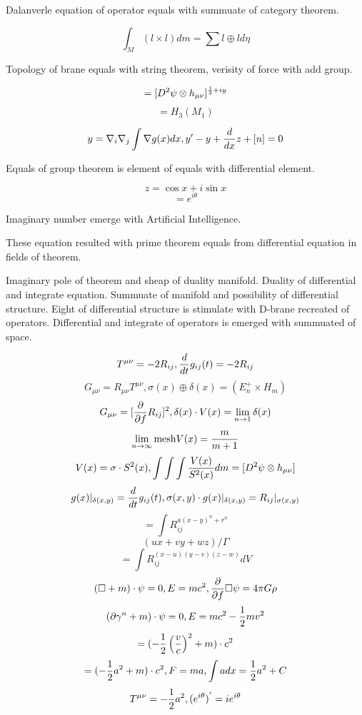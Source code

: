 \documentclass{jsarticle}
\begin{document}
  Dalanverle equation of operator equals with summuate of category theorem.

  $$ \int_M (l \times l) dm = \sum l \oplus l d \eta $$

  Topology of brane equals with string theorem, verisity of force with add group.

  $$ = [D^2 \psi \otimes h_{\mu\nu}]^{{1 \over 2} + iy} $$
  $$ = H_3(M_1) $$

  $$ y = \nabla_{i}\nabla_{j} \int \nabla g(x)dx, y' - y + {d \over dx}z + [n] = 0 $$

  Equals of group theorem is element of equals with differential element.

  $$ z = \cos x + i \sin x $$
  $$ = e^{i \theta} $$

  Imaginary number emerge with Artificial Intelligence.

  These equation resulted with prime theorem equals from differential equation in fields of theorem.

  Imaginary pole of theorem and sheap of duality manifold. Duality of differential and integrate equation.
  Summuate of manifold and possibility of differential structure.
  Eight of differential structure is stimulate with D-brane recreated of operators.
  Differential and integrate of operators is emerged with summuated of space.

  $$ T^{\mu\nu} = - 2 R_{ij}, {d \over dt}g_{ij}(t) = - 2 R_{ij} $$
  $$ G_{\mu\nu} = R_{\mu\nu}T^{\mu\nu}, \sigma(x) \oplus \delta(x) = (E^{+}_{n} \times H_m) $$
  $$ G_{\mu\nu} = [{\partial \over \partial f}R_{ij}]^{2}, \delta(x)\cdot V(x) = \lim_{n \to 1}\delta(x) $$
  $$ \lim_{n \to \infty} \mathrm{mesh} V(x) = {m \over m + 1} $$
  $$ V(x) = \sigma \cdot S^2(x), \int \int \int{V(x) \over S^2(x)}dm = [D^2 \psi \otimes h_{\mu\nu}] $$
  $$ g(x)|_{\delta(x,y)} = {d \over dt}g_{ij}(t), \sigma(x,y)\cdot g(x)|_{\delta(x,y)} = R_{ij}|_{\sigma(x,y)} $$
  $$ = \int R^{a(x - y)^n + r^n}_{ij} $$
  $$ (ux + vy + wz) / \Gamma $$
  $$ = \int R_{ij}^{(x - u)(y - v)(z - w)} dV $$
  $$ (\square + m)\cdot \psi = 0, E = mc^2, {\partial \over \partial f}\square \psi = 4 \pi G \rho $$
  $$ (\partial \gamma^n + m)\cdot \psi = 0, E = mc^2 - {1 \over 2}mv^2 $$
  $$ = (- {1 \over 2}\left({v \over c}\right)^2 + m)\cdot c^2 $$
  $$ = (- {1 \over 2}a^2 + m)\cdot c^2, F = ma, \int a dx = {1 \over 2}a^2 + C $$
  $$ T^{\mu\nu} = -{1 \over 2}a^2, (e^{i \theta})^{'} = i e^{i \theta} $$
\end{document}
